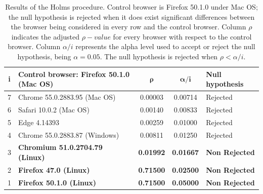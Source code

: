 \documentclass{article}
\begin{document}
\setlength{\tabcolsep}{10pt}
\begin{table}
\caption{Results of the Holms procedure. Control browser is Firefox 50.1.0 under Mac OS; the null hypothesis is rejected when it does exist significant differences between the browser being considered in every row and the control browser. Column $\rho$ indicates the adjusted $\rho-value$ for every browser with respect to the control browser. Column  $\alpha/i$ represents the alpha level used to accept or reject the null hypothesis, being $\alpha=0.05$. The null hypothesis is rejected when $\rho<\alpha/i$.}
\label{tab:holm-results}
\begin{center}
\begin{tabular}{cp{45mm}ccl}
\bf i & \bf Control browser: \newline Firefox 50.1.0 (Mac OS)	&	$\mathbf{\rho}$	&	\bf $\mathbf{\alpha/i}$	&	\bf Null hypothesis	\\
\hline



 7 &  Chrome 55.0.2883.95 (Mac OS)	&	 0.00003	&	 0.00714	&	 Rejected	\\
 6 &  Safari 10.0.2 (Mac OS)		&	 0.00140	&	 0.00833	&	 Rejected	\\
 5 & Edge 4.14393				&	 0.00259	&	 0.01000	&	 Rejected	\\
 4 &  Chrome 55.0.2883.87 (Windows)	&	 0.00811	&	 0.01250	&	 Rejected	\\
3 &  \bf Chromium 51.0.2704.79 (Linux)	&	\bf 0.01992	&	\bf 0.01667	&	\bf Non Rejected	\\
2 & \bf Firefox 47.0 (Linux)			&	\bf 0.71500	&	\bf 0.02500	&	\bf Non Rejected	\\
1 & \bf Firefox 50.1.0 (Linux)		&	\bf 0.71500	&	\bf 0.05000	&	\bf Non Rejected	\\
\hline
\end{tabular}
\end{center}
\end{table}
\end{document}
